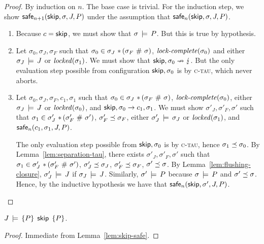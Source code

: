 \documentclass[11pt]{report}
\begin{document}
\begin{proof}
	By induction on $n$. The base case is trivial. For the induction step, we show $\mathsf{safe}_{n+1}(\operatorname{\mathsf{skip}},\sigma,J,P)$ under the assumption that $\mathsf{safe}_{n}(\operatorname{\mathsf{skip}},\sigma,J,P)$. 
	\begin{enumerate}
		\item Because $c = \operatorname{\mathsf{skip}}$, we must show that $\sigma \,\models\, P$. But this is true by hypothesis. 

		\item Let $\sigma_0,\sigma_J,\sigma_F$ such that $\sigma_0 \in \sigma_J \operatorname{\,\ast\,} (\sigma_F \operatorname{\,\#\,} \sigma)$, $\text{\textit{lock-complete}}(\sigma_0)$ and either $\sigma_J \,\models\, J$ or $\mathit{locked}(\sigma_1)$. We must show that $\operatorname{\mathsf{skip}},\sigma_0 \nrightarrow \lightning$. But the only evaluation step possible from configuration $\operatorname{\mathsf{skip}},\sigma_0$ is by \textsc{c-tau}, which never aborts. 

		\item Let $\sigma_0,\sigma_J,\sigma_F,c_1,\sigma_1$ such that $\sigma_0 \in \sigma_J \operatorname{\,\ast\,} (\sigma_F \operatorname{\,\#\,} \sigma)$, $\text{\textit{lock-complete}}(\sigma_0)$, either $\sigma_J \,\models\, J$ or $\mathit{locked}(\sigma_0)$, and $\operatorname{\mathsf{skip}},\sigma_0 \rightarrow c_1,\sigma_1$. We must show $\sigma'_J,\sigma'_F,\sigma'$ such that $\sigma_1 \in \sigma'_J \operatorname{\,\ast\,} (\sigma'_F \operatorname{\,\#\,} \sigma')$, $\sigma'_F \preceq \sigma_F$, either $\sigma'_J \,\models\, \sigma_J$ or $\mathit{locked}(\sigma_1)$, and $\mathsf{safe}_{n}(c_1,\sigma_1,J,P)$.

		The only evaluation step possible from $\operatorname{\mathsf{skip}},\sigma_0$ is by \textsc{c-tau}, hence $\sigma_1 \preceq \sigma_0$. By Lemma~\ref{lem:separation-tau}, there exists $\sigma'_J,\sigma'_F,\sigma'$ such that $\sigma_1 \in \sigma'_J \operatorname{\,\ast\,} (\sigma'_F \operatorname{\,\#\,} \sigma')$, $\sigma'_J \preceq \sigma_J$, $\sigma'_F \preceq \sigma_F$, $\sigma' \preceq \sigma$. By Lemma~\ref{lem:flushing-closure}, $\sigma'_J \,\models\, J$ if $\sigma_J \,\models\, J$. Similarly, $\sigma' \,\models\, P$ because $\sigma \,\models\, P$ and $\sigma' \preceq \sigma$. Hence, by the inductive hypothesis we have that $\mathsf{safe}_{n}(\operatorname{\mathsf{skip}},\sigma',J,P)$. 
	\end{enumerate}
\end{proof}

\begin{lemma}
	\label{lem:skip-sound}
	$J\,\models\,\left\lbrace P \right\rbrace\;\operatorname{\mathsf{skip}}\;\left\lbrace P \right\rbrace$. 
\end{lemma}

\begin{proof}
	Immediate from Lemma~\ref{lem:skip-safe}. 
\end{proof}
\end{document}
